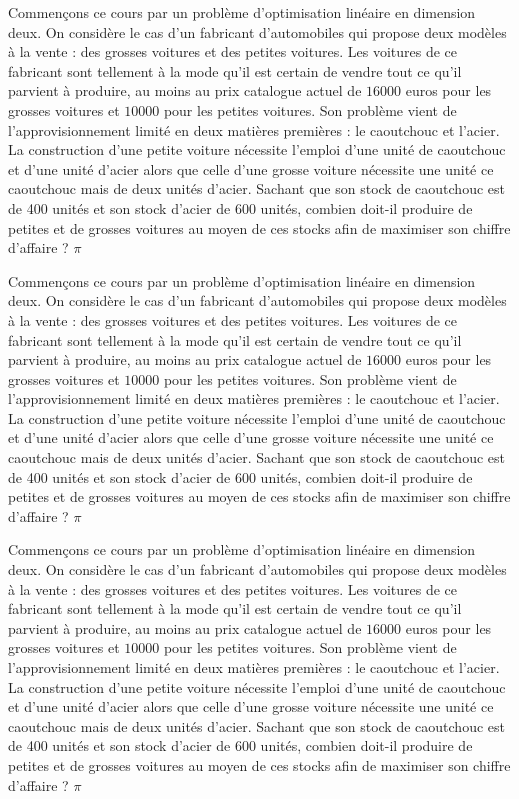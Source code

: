 \documentclass[a4paper, 11pt,openany]{book}%
\newtheorem[L]{thm}{Théorème}[section]
\newtheorem[M]{propo}[thm]{Proposition}
\newtheorem[M]{prop}[thm]{Propriété}
\newtheorem[M]{coro}[thm]{Corollaire}
\newtheorem[M]{lem}[thm]{Lemme}
\newtheorem[M,bodystyle=]{defi}[thm]{Définition}
\newtheorem[M,bodystyle=]{remark}[thm]{Remarque}
\newtheorem[M,bodystyle=]{met}[thm]{Méthode}
\newtheorem[M,bodystyle=]{ret}[thm]{A retenir}
\newtheorem[M,bodystyle=]{idee}[thm]{Idée}
\newtheorem[style=S,underline=false,bodystyle=]{exem}[thm]{Exemple}
\newtheorem[S,underline=false,bodystyle=]{exo}[thm]{Exercice}
\newtheorem[S,underline=false,bodystyle=]{appli}[thm]{Application}
\newtheorem[S,underline=false,bodystyle=]{sol}[thm]{Solution}
\newtheorem[S,underline=false,bodystyle=]{hypo}[thm]{Hypothesis}
\newtheorem[S,underline=false,bodystyle=]{nota}[thm]{Notation}
\begin{document}
                                 Commençons ce cours par un problème d'optimisation linéaire en dimension deux. On considère le cas d'un fabricant d'automobiles qui propose deux modèles à la vente : des grosses voitures et des petites voitures. Les voitures de ce fabricant sont tellement à la mode qu'il est certain de vendre tout ce qu'il parvient à produire, au moins au prix catalogue actuel de $16000$ euros pour les grosses voitures et $10000$ pour les petites voitures. Son problème vient de l'approvisionnement limité en deux matières premières : le caoutchouc et l'acier. La construction d'une petite voiture nécessite l'emploi d'une unité de caoutchouc et d'une unité d'acier alors que celle d'une grosse voiture nécessite une unité ce caoutchouc mais de deux unités d'acier. Sachant que son stock de caoutchouc est de 400 unités et son stock d'acier de 600 unités, combien doit-il produire de petites et de grosses voitures au moyen de ces stocks afin de maximiser son chiffre d'affaire ? $\pi$

                                 



         

            Commençons ce cours par un problème d'optimisation linéaire en dimension deux. On considère le cas d'un fabricant d'automobiles qui propose deux modèles à la vente : des grosses voitures et des petites voitures. Les voitures de ce fabricant sont tellement à la mode qu'il est certain de vendre tout ce qu'il parvient à produire, au moins au prix catalogue actuel de $16000$ euros pour les grosses voitures et $10000$ pour les petites voitures. Son problème vient de l'approvisionnement limité en deux matières premières : le caoutchouc et l'acier. La construction d'une petite voiture nécessite l'emploi d'une unité de caoutchouc et d'une unité d'acier alors que celle d'une grosse voiture nécessite une unité ce caoutchouc mais de deux unités d'acier. Sachant que son stock de caoutchouc est de 400 unités et son stock d'acier de 600 unités, combien doit-il produire de petites et de grosses voitures au moyen de ces stocks afin de maximiser son chiffre d'affaire ? $\pi$

            

               Commençons ce cours par un problème d'optimisation linéaire en dimension deux. On considère le cas d'un fabricant d'automobiles qui propose deux modèles à la vente : des grosses voitures et des petites voitures. Les voitures de ce fabricant sont tellement à la mode qu'il est certain de vendre tout ce qu'il parvient à produire, au moins au prix catalogue actuel de $16000$ euros pour les grosses voitures et $10000$ pour les petites voitures. Son problème vient de l'approvisionnement limité en deux matières premières : le caoutchouc et l'acier. La construction d'une petite voiture nécessite l'emploi d'une unité de caoutchouc et d'une unité d'acier alors que celle d'une grosse voiture nécessite une unité ce caoutchouc mais de deux unités d'acier. Sachant que son stock de caoutchouc est de 400 unités et son stock d'acier de 600 unités, combien doit-il produire de petites et de grosses voitures au moyen de ces stocks afin de maximiser son chiffre d'affaire ? $\pi$
\end{document}
